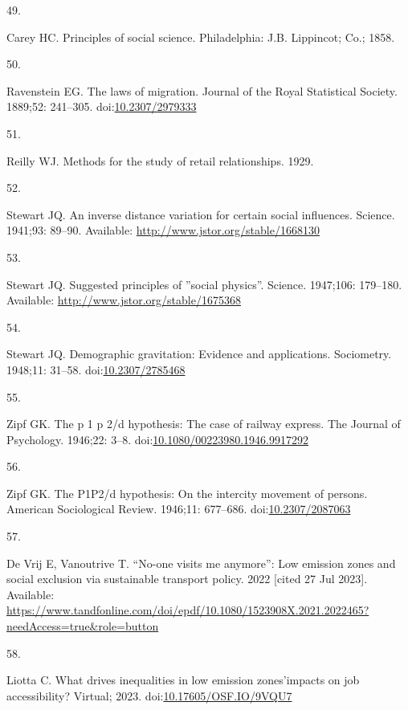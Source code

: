 \documentclass[10pt,letterpaper]{article}
\newlength{\cslhangindent}
\newlength{\csllabelwidth}
\newlength{\cslentryspacingunit} %
\newenvironment{CSLReferences}[2] %
 {%
  \setlength{\parindent}{0pt}
  \ifodd #1
  \let\oldpar\par
  \def\par{\hangindent=\cslhangindent\oldpar}
  \fi
  \setlength{\parskip}{#2\cslentryspacingunit}
 }%
 {}
\newcommand{\CSLLeftMargin}[1]{\parbox[t]{\csllabelwidth}{#1}}
\newcommand{\CSLRightInline}[1]{\parbox[t]{\linewidth - \csllabelwidth}{#1}\break}
\begin{document}
\begin{CSLReferences}{0}{0}
\leavevmode{}%
\CSLLeftMargin{49. }%
\CSLRightInline{Carey HC. Principles of social science. Philadelphia:
J.B. Lippincot; Co.; 1858. }

\leavevmode{}%
\CSLLeftMargin{50. }%
\CSLRightInline{Ravenstein EG. The laws of migration. Journal of the
Royal Statistical Society. 1889;52: 241--305.
doi:\href{https://doi.org/10.2307/2979333}{10.2307/2979333}}

\leavevmode{}%
\CSLLeftMargin{51. }%
\CSLRightInline{Reilly WJ. Methods for the study of retail
relationships. 1929. }

\leavevmode{}%
\CSLLeftMargin{52. }%
\CSLRightInline{Stewart JQ. An inverse distance variation for certain
social influences. Science. 1941;93: 89--90. Available:
\url{http://www.jstor.org/stable/1668130}}

\leavevmode{}%
\CSLLeftMargin{53. }%
\CSLRightInline{Stewart JQ. Suggested principles of ''social physics''.
Science. 1947;106: 179--180. Available:
\url{http://www.jstor.org/stable/1675368}}

\leavevmode{}%
\CSLLeftMargin{54. }%
\CSLRightInline{Stewart JQ. Demographic gravitation: Evidence and
applications. Sociometry. 1948;11: 31--58.
doi:\href{https://doi.org/10.2307/2785468}{10.2307/2785468}}

\leavevmode{}%
\CSLLeftMargin{55. }%
\CSLRightInline{Zipf GK. The p 1 p 2/d hypothesis: The case of railway
express. The Journal of Psychology. 1946;22: 3--8.
doi:\href{https://doi.org/10.1080/00223980.1946.9917292}{10.1080/00223980.1946.9917292}}

\leavevmode{}%
\CSLLeftMargin{56. }%
\CSLRightInline{Zipf GK. The P1P2/d hypothesis: On the intercity
movement of persons. American Sociological Review. 1946;11: 677--686.
doi:\href{https://doi.org/10.2307/2087063}{10.2307/2087063}}

\leavevmode{}%
\CSLLeftMargin{57. }%
\CSLRightInline{De Vrij E, Vanoutrive T. {``No-one visits me anymore''}:
Low emission zones and social exclusion via sustainable transport
policy. 2022 {[}cited 27 Jul 2023{]}. Available:
\url{https://www.tandfonline.com/doi/epdf/10.1080/1523908X.2021.2022465?needAccess=true\&role=button}}

\leavevmode{}%
\CSLLeftMargin{58. }%
\CSLRightInline{Liotta C. What drives inequalities in low emission
zones'impacts on job accessibility? Virtual; 2023.
doi:\href{https://doi.org/10.17605/OSF.IO/9VQU7}{10.17605/OSF.IO/9VQU7}}

\end{CSLReferences}

\nolinenumbers
\end{document}

